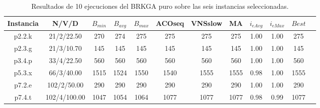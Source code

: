 \bigskip

\begin{table}[H]
\begin{center}
\begin{tabular}{ |c|c|c|c|c|c|c|c|c|c|c|c| } 
\hline
Instancia & N/V/D & $B_{min}$ & $B_{avg}$ & $B_{max}$ & ACOseq & VNSslow & MA & $i_{eAvg}$ & $i_{eMax}$ & $Best$ \\
\hline
p2.2.k & 21/2/22.50 & 270 & 274 & 275 & 275 & 275 & 275 & 1.00 & 1.00 & 275 \\
p2.3.g & 21/3/10.70 & 145 & 145 & 145 & 145 & 145 & 145 & 1.00 & 1.00 & 145 \\
p3.4.p & 33/4/22.50 & 560 & 560 & 560 & 560 & 560 & 560 & 1.00 & 1.00 & 560 \\
p5.3.x & 66/3/40.00 & 1515 & 1524 & 1550 & 1540 & 1555 & 1555 & 0.98 & 1.00 & 1555 \\
p7.2.e & 102/2/50.00 & 290 & 290 & 290 & 290 & 290 & 290 & 1.00 & 1.00 & 290 \\
p7.4.t & 102/4/100.00 & 1047 & 1054 & 1064 & 1077 & 1077 & 1077 & 0.98 & 0.99 & 1077 \\
\hline
\end{tabular}
\end{center}
\caption{Resultados de 10 ejecuciones del BRKGA puro sobre las seis instancias seleccionadas.}
\label{tab:resultadosBrkgaPuro}
\end{table}

